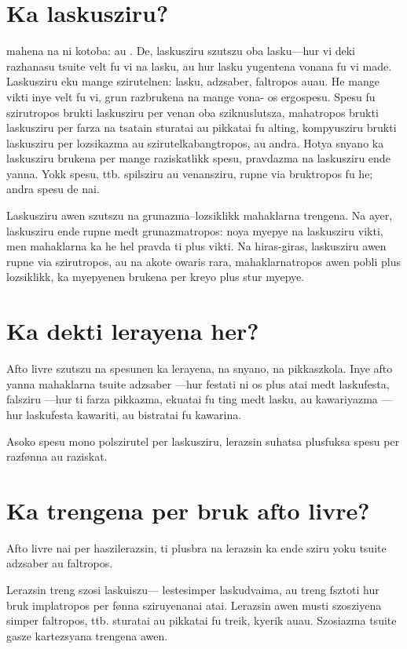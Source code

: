 \section{Ka laskusziru?}
 mahena na ni kotoba:  au . De, laskusziru
szutszu oba lasku---hur vi deki razhanasu tsuite velt fu vi na lasku,
au hur lasku yugentena vonana fu vi made. Laskusziru eku mange szirutelnen:
lasku, adzsaber, faltropos auau. He mange vikti inye velt fu vi, grun
razbrukena na mange vona- os ergospesu. Spesu fu szirutropos brukti laskusziru
per venan oba sziknuslutsza, mahatropos brukti laskusziru per farza na tsatain
sturatai au pikkatai fu alting, kompyusziru brukti laskusziru per lozsikazma au
szirutelkabangtropos, au andra. Hotya snyano ka laskusziru brukena per mange
raziskatlikk spesu, pravdazma na laskusziru ende yanna. Yokk spesu, ttb.
spilsziru au venansziru, rupne via bruktropos fu he; andra spesu de nai.

Laskusziru awen szutszu na grunazma--lozsiklikk mahaklarna trengena. Na ayer,
laskusziru ende rupne medt grunazmatropos: noya myepye na laskusziru vikti,
men mahaklarna ka he hel pravda ti plus vikti. Na hiras-giras, laskusziru
awen rupne via szirutropos, au na akote owaris rara, mahaklarnatropos awen
pobli plus lozsiklikk, ka myepyenen brukena per kreyo plus stur myepye.

\section{Ka dekti lerayena her?}
Afto livre szutszu na spesunen ka lerayena, na snyano, na pikkaszkola. Inye
afto yanna mahaklarna tsuite adzsaber ---hur festati ni os plus atai medt
laskufesta, falsziru ---hur ti farza pikkazma, ekuatai fu ting medt lasku,
au kawariyazma ---hur laskufesta kawariti, au bistratai fu kawarina.

Asoko spesu mono polszirutel per laskusziru, lerazsin suhatsa plusfuksa
spesu per razfønna au raziskat.

\section{Ka trengena per bruk afto livre?}
Afto livre nai per haszilerazsin, ti plusbra na lerazsin ka ende sziru yoku
tsuite adzsaber au faltropos.

Lerazsin treng szosi laskuiszu--- lestesimper laskudvaima, au treng fsztoti hur
bruk implatropos per fønna sziruyenanai atai. Lerazsin
awen musti szosziyena simper faltropos, ttb. sturatai au pikkatai
fu treik, kyerik auau. Szosiazma tsuite gasze kartezsyana trengena awen.

